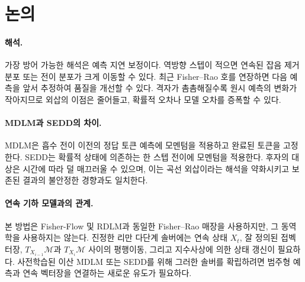 \section{논의}

\paragraph{해석.}
가장 방어 가능한 해석은 예측 지연 보정이다. 역방향 스텝이 적으면 연속된 잡음 제거 분포 또는
전이 분포가 크게 이동할 수 있다. 최근 Fisher--Rao 호를 연장하면 다음 예측을 앞서 추정하여 품질을
개선할 수 있다. 격자가 촘촘해질수록 원시 예측의 변화가 작아지므로 외삽의 이점은 줄어들고,
확률적 오차나 모델 오차를 증폭할 수 있다.

\paragraph{MDLM과 SEDD의 차이.}
MDLM은 흡수 전이 이전의 정답 토큰 예측에 모멘텀을 적용하고 완료된 토큰을 고정한다. SEDD는
확률적 상태에 의존하는 한 스텝 전이에 모멘텀을 적용한다. 후자의 대상은 시간에 따라 덜 매끄러울 수
있으며, 이는 곡선 외삽이라는 해석을 약화시키고 보존된 결과의 불안정한 경향과도 일치한다.

\paragraph{연속 기하 모델과의 관계.}
본 방법은 Fisher-Flow 및 RDLM과 동일한 Fisher--Rao 매장을 사용하지만, 그 동역학을 사용하지는
않는다. 진정한 리만 다단계 솔버에는 연속 상태 $X_t$, 잘 정의된 접벡터장, $T_{X_{i-1}}\mathcal{M}$과
$T_{X_i}\mathcal{M}$ 사이의 평행이동, 그리고 지수사상에 의한 상태 갱신이 필요하다. 사전학습된
이산 MDLM 또는 SEDD를 위해 그러한 솔버를 확립하려면 범주형 예측과 연속 벡터장을 연결하는 새로운
유도가 필요하다.
